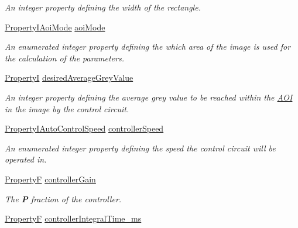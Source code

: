 \begin{DoxyCompactItemize}
\begin{DoxyCompactList}\small\item\em An integer property defining the width of the rectangle. \end{DoxyCompactList}\item 
\hyperlink{group___common_interface_gac29dd0ca928e4e97eeb1a038ddb4f2af}{Property\+I\+Aoi\+Mode} \hyperlink{classmv_i_m_p_a_c_t_1_1acquire_1_1_auto_control_parameters_ae1c292764fb42e9a4b84f94b14b9f677}{aoi\+Mode}
\begin{DoxyCompactList}\small\item\em An enumerated integer property defining the which area of the image is used for the calculation of the parameters. \end{DoxyCompactList}\item 
\hyperlink{group___common_interface_ga12d5e434238ca242a1ba4c6c3ea45780}{Property\+I} \hyperlink{classmv_i_m_p_a_c_t_1_1acquire_1_1_auto_control_parameters_a91ac507b9c8d022db1f05eda5b6c9404}{desired\+Average\+Grey\+Value}
\begin{DoxyCompactList}\small\item\em An integer property defining the average grey value to be reached within the \hyperlink{struct_a_o_i}{A\+O\+I} in the image by the control circuit. \end{DoxyCompactList}\item 
\hyperlink{group___device_specific_interface_ga8b56e568f48f677546ec6dc38012e108}{Property\+I\+Auto\+Control\+Speed} \hyperlink{classmv_i_m_p_a_c_t_1_1acquire_1_1_auto_control_parameters_a61db1186975bedfc4576a68fe7213521}{controller\+Speed}
\begin{DoxyCompactList}\small\item\em An enumerated integer property defining the speed the control circuit will be operated in. \end{DoxyCompactList}\item 
\hyperlink{group___common_interface_gaf54865fe5a3d5cfd15f9a111b40d09f9}{Property\+F} \hyperlink{classmv_i_m_p_a_c_t_1_1acquire_1_1_auto_control_parameters_a3971197feb0538d2c231bce97390603a}{controller\+Gain}
\begin{DoxyCompactList}\small\item\em The {\bfseries P} fraction of the controller. \end{DoxyCompactList}\item 
\hyperlink{group___common_interface_gaf54865fe5a3d5cfd15f9a111b40d09f9}{Property\+F} \hyperlink{classmv_i_m_p_a_c_t_1_1acquire_1_1_auto_control_parameters_a1c2f5bc53c0664de702b0c9e6a81d2f0}{controller\+Integral\+Time\+\_\+ms}

\end{DoxyCompactItemize}
